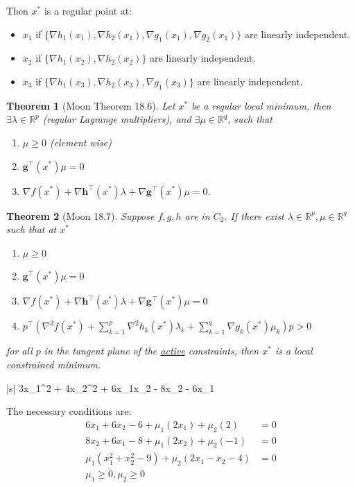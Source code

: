 \documentclass{article}
\newtheorem{theorem}{Theorem}[section]
\newcommand{\gbf}{\mathbf{g}}
\newcommand{\hbf}{\mathbf{h}}
\begin{document}
	  	 
	Then $x^{\ast}$ is a regular point at:
	\begin{itemize}
		\item $x_1$ if 
			$\{ \nabla h_1(x_1), \nabla h_2(x_1), \nabla g_1(x_1), \nabla g_2(x_1) \}$ are  linearly independent.
		\item $x_2$ if 
			$\{ \nabla h_1(x_2), \nabla h_2(x_2) \}$ are linearly independent.
		\item $x_3$ if 
			$\{ \nabla h_1(x_3), \nabla h_2(x_3), \nabla g_1(x_3) \}$ are linearly independent.
	\end{itemize}


\par{}	
	\begin{theorem}[Moon Theorem 18.6]
		Let $x^{\ast}$ be a regular local minimum, then 
		$\exists \lambda \in \mathbb{R}^p$ 
		(regular Lagrange multipliers), and
		$\exists \mu \in \mathbb{R}^q$, 
		such that
		\begin{enumerate}
		  \item $\mu \geq 0$ (element wise)
		  \item $\gbf^\top (x^{\ast})\mu = 0$
		  \item $ \nabla f(x^{\ast}) + \nabla \hbf^\top (x^{\ast})\lambda + \nabla \gbf^\top (x^{\ast})\mu = 0$.
		\end{enumerate}		
	\end{theorem}

	\begin{theorem}[Moon 18.7]
		Suppose $f,g,h$ are in $C_2$.
		If there exist $\lambda \in \mathbb{R}^p, \mu \in \mathbb{R}^q$ such that at $x^{\ast}$
		\begin{enumerate}
		  \item $\mu \geq 0$
		  \item $\gbf^\top (x^{\ast})\mu = 0$
		  \item $\nabla f(x^{\ast}) + \nabla \hbf^\top (x^{\ast})\lambda + \nabla \gbf^\top (x^{\ast})\mu = 0$
		  \item $p^\top (\nabla^2f(x^{\ast}) + \sum_{k=1}^p \nabla^2 h_k(x^{\ast})\lambda_k + \sum_{k=1}^q \nabla g_k(x^{\ast})\mu_k )p > 0 $
		\end{enumerate}
		for all $p$ in the tangent plane of the \underline{active} constraints, then $x^{\ast}$ is a local constrained minimum.		
	\end{theorem}

\par{}
	\begin{mini*}|s|
		{}{3x_1^2 + 4x_2^2 + 6x_1x_2 - 8x_2 - 6x_1}{}{}
	\end{mini*}
	The necessary conditions are:
	\begin{align*}
		6x_1 + 6x_2 - 6 + \mu_1(2x_1)+\mu_2(2) &= 0\\
		8x_2 + 6x_1 - 8 + \mu_1(2x_2)+\mu_2(-1) &= 0\\
		\mu_1(x_1^2+x_2^2-9) + \mu_2(2x_1 - x_2 - 4) &= 0 \\
		\mu_1 \geq 0, \mu_2 \geq 0
	\end{align*}
\end{document}
